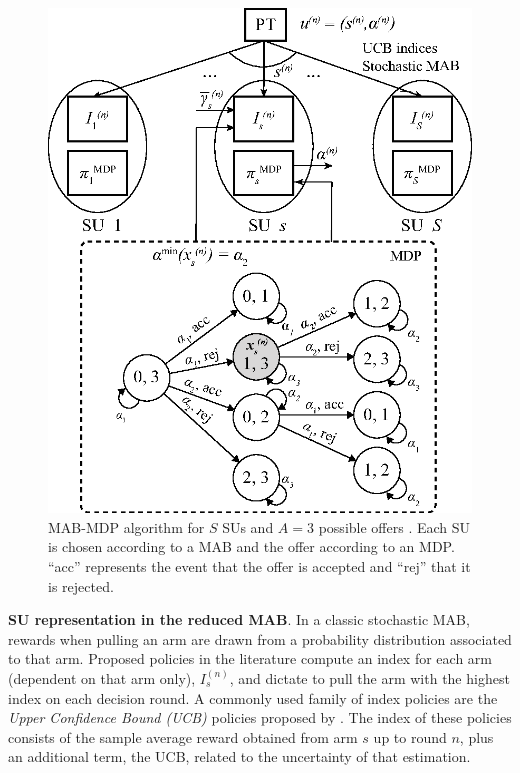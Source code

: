\begin{figure}[!t]
\centering
\includegraphics[scale=0.9]{Esquema.eps}
\caption{MAB-MDP algorithm for $S$ SUs and $A=3$ possible offers . Each SU is chosen according to a MAB and the offer according to an MDP. ``acc'' represents the event that the offer is accepted and ``rej'' that it is rejected.}
\label{fig:Esquema}
\vspace{-1.5em}
\end{figure}

\textbf{SU representation in the reduced MAB}. In a classic stochastic MAB, rewards when pulling an arm are drawn from a probability distribution associated to that arm. Proposed policies in the literature compute an index for each arm (dependent on that arm only), $I_s^{(n)}$, and dictate to pull the arm with the highest index on each decision round. A commonly used family of index policies are the \textit{Upper Confidence Bound (UCB)} policies proposed by \cite{ref:Auer2002}. 
The index of these policies consists of the sample average reward obtained from arm $s$ up to round $n$, plus an additional term, the UCB, related to the uncertainty of that estimation. 

